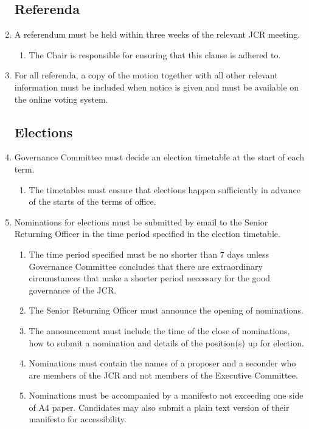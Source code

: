 \documentclass[12pt]{article}
\begin{document}
\begin{enumerate}
    \subsection{Referenda}
    \item A referendum must be held within three weeks of the relevant JCR meeting.
    \begin{enumerate}
        \item The Chair is responsible for ensuring that this clause is adhered to.
    \end{enumerate}
    \item For all referenda, a copy of the motion together with all other relevant information must be included when notice is given and must be available on the online voting system.
    \subsection{Elections}
    \item Governance Committee must decide an election timetable at the start of each term.
    \begin{enumerate}
        \item The timetables must ensure that elections happen sufficiently in advance of the starts of the terms of office.
    \end{enumerate}
    \item Nominations for elections must be submitted by email to the Senior Returning Officer in the time period specified in the election timetable.
    \begin{enumerate}
        \item The time period specified must be no shorter than 7 days unless Governance Committee concludes that there are extraordinary circumstances that make a shorter period necessary for the good governance of the JCR.
        \item The Senior Returning Officer must announce the opening of nominations.
        \item The announcement must include the time of the close of nominations, how to submit a nomination and details of the position(s) up for election.
        \item Nominations must contain the names of a proposer and a seconder who are members of the JCR and not members of the Executive Committee.
        \item Nominations must be accompanied by a manifesto not exceeding one side of A4 paper. Candidates may also submit a plain text version of their manifesto for accessibility.

\end{enumerate}
\end{enumerate}
\end{document}
